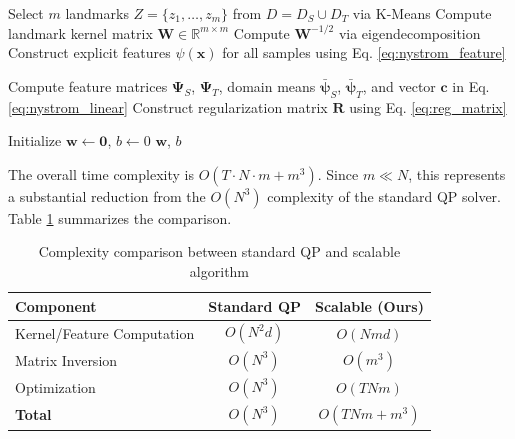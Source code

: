 \documentclass[a4paper]{cas-sc}
\begin{document}
\begin{algorithm}[t]
\caption{TL-QLDMR via Nystr\"{o}m-SGD}
\label{alg:fast_TL-QLDMR}

Select $m$ landmarks $Z = \{z_1, \ldots, z_m\}$ from $D = D_S \cup D_T$ via K-Means\;
Compute landmark kernel matrix $\boldsymbol{W} \in \mathbb{R}^{m \times m}$\;
Compute $\boldsymbol{W}^{-1/2}$ via eigendecomposition\;
Construct explicit features $\psi(\boldsymbol{x})$ for all samples using Eq. \eqref{eq:nystrom_feature}\;

Compute feature matrices $\boldsymbol{\Psi}_S$, $\boldsymbol{\Psi}_T$, domain means $\bar{\boldsymbol{\psi}}_S$, $\bar{\boldsymbol{\psi}}_T$, and vector $\boldsymbol{c}$ in Eq. \eqref{eq:nystrom_linear}\;
Construct regularization matrix $\boldsymbol{R}$ using Eq. \eqref{eq:reg_matrix}\;

Initialize $\boldsymbol{w} \leftarrow \boldsymbol{0}$, $b \leftarrow 0$\;
\Return $\boldsymbol{w}$, $b$\;
\end{algorithm}

The overall time complexity is $O(T \cdot N \cdot m + m^3)$. Since $m \ll N$, this represents a substantial reduction from the $O(N^3)$ complexity of the standard QP solver. Table \ref{tab:complexity} summarizes the comparison.

\begin{table}[htbp]
\centering
\caption{Complexity comparison between standard QP and scalable algorithm}
\label{tab:complexity}
\begin{tabular}{lcc}
\toprule
\textbf{Component} & \textbf{Standard QP} & \textbf{Scalable (Ours)} \\
\midrule
Kernel/Feature Computation & $O(N^2 d)$ & $O(N m d)$ \\
Matrix Inversion & $O(N^3)$ & $O(m^3)$ \\
Optimization & $O(N^3)$ & $O(T N m)$ \\
\midrule
\textbf{Total} & $O(N^3)$ & $O(T N m + m^3)$ \\
\bottomrule
\end{tabular}
\end{table}
\end{document}
